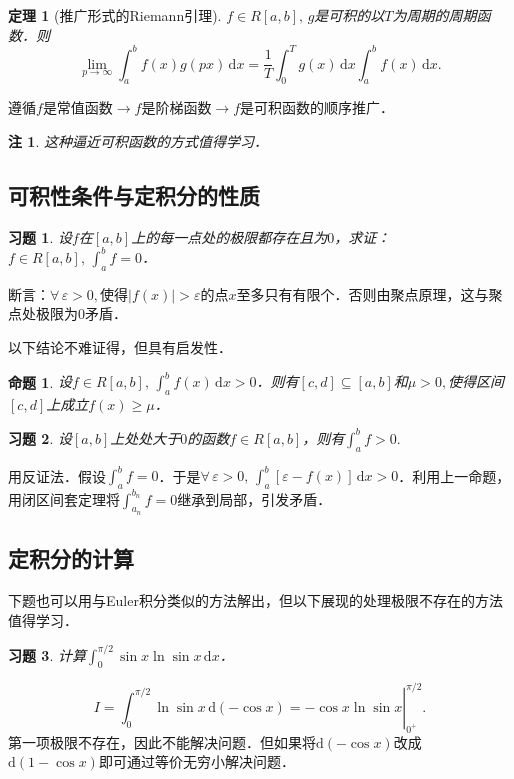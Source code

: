 \documentclass[11pt,a4paper]{ctexart}
\makeatletter
\theoremstyle{thmseries} %
\newtheorem{thm}{定理}[section]
\newtheorem{prop}{命题}[section]
\theoremstyle{exerseries}
\newtheorem{exer}{习题}[section]
\newtheorem*{rem}{注}
\renewenvironment{proof}[1][\proofname]{\par
  \pushQED{\qed}%
  \normalfont \topsep6\p@\@plus6\p@\relax
  \trivlist
  \item[\hskip\labelsep
        \itshape
    #1\@addpunct{}]\ignorespaces
}{%
  \popQED\endtrivlist\@endpefalse
}
\newenvironment{sol}{\begin{proof}[\bfseries\upshape 解\quad]}{\end{proof}}
\newenvironment{pf}{\begin{proof}[\bfseries\upshape 证\quad]}{\end{proof}}
\renewcommand{\epsilon}{\varepsilon}
\renewcommand{\d}{\mathrm{d}}
\makeatother
\begin{document}
\begin{thm}[推广形式的Riemann引理]
	$f\in R[a,b],\,g$是可积的以$T$为周期的周期函数．则
	\[\lim_{p\to\infty}\int_{a}^{b}f(x)g(px)\,\d x=\frac{1}{T}\int_{0}^{T}g(x)\,\d x\int_{a}^{b}f(x)\,\d x.\]
\end{thm}
\begin{pf}
	遵循$f$是常值函数$\to f$是阶梯函数$\to f$是可积函数的顺序推广．
\end{pf}
\begin{rem}
	这种逼近可积函数的方式值得学习．
\end{rem}


\subsection{可积性条件与定积分的性质}
\begin{exer}
	设$f$在$[a,b]$上的每一点处的极限都存在且为$0$，求证：$f\in R[a,b],\,\int_{a}^{b}f=0$．
\end{exer}
\begin{pf}
	断言：$\forall\,\epsilon>0,$使得$|f(x)|>\epsilon$的点$x$至多只有有限个．否则由聚点原理，这与聚点处极限为0矛盾．
\end{pf}

以下结论不难证得，但具有启发性．
\begin{prop}
	设$f\in R[a,b],\,\int_{a}^{b}f(x)\,\d x>0$．则有$[c,d]\subseteq[a,b]$和$\mu>0,$使得区间$[c,d]$上成立$f(x)\geq\mu$．
\end{prop}

\begin{exer}
	设$[a,b]$上处处大于$0$的函数$f\in R[a,b]$，则有$\int_{a}^{b}f>0.$
\end{exer}
\begin{pf}
	用反证法．假设$\int_{a}^{b}f=0$．于是$\forall\,\epsilon>0,\,\int_{a}^{b}[\epsilon-f(x)]\,\d x>0$．利用上一命题，用闭区间套定理将$\int_{a_n}^{b_n}f=0$继承到局部，引发矛盾．
\end{pf}


\subsection{定积分的计算}
下题也可以用与Euler积分类似的方法解出，但以下展现的处理极限不存在的方法值得学习．
\begin{exer}
	计算$\int_{0}^{\pi/2}\sin x\ln\sin x\,\d x$．
\end{exer}
\begin{sol}
	\[\left.I=\int_{0}^{\pi/2}\ln\sin x\,\d(-\cos x)=-\cos x\ln\sin x\right|_{0^+}^{\pi/2}.\]
	第一项极限不存在，因此不能解决问题．但如果将$\d(-\cos x)$改成$\d(1-\cos x)$即可通过等价无穷小解决问题．
\end{sol}
\end{document}
